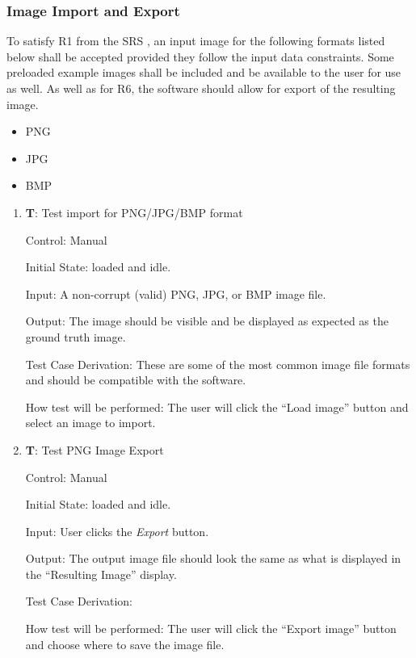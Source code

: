 \documentclass[12pt, titlepage]{article}
\newcounter{testnum} %
\begin{document}
\subsubsection{Image Import and Export} \label{subsec_img_io}

To satisfy R1 from the SRS \citep{SRS}, an input image for the following formats listed below shall be 
accepted provided they follow the input data constraints.
Some preloaded example images shall be included and be available to the user for use as well.
As well as for R6, the software should allow for export of the resulting image.

\begin{itemize}
  \item{PNG}
  \item{JPG}
  \item{BMP\\}
\end{itemize}

\begin{enumerate}

  \item{\textbf{T\thetestnum \label{T_inputImage}}: Test import for PNG/JPG/BMP format\\}
            
  Control: Manual
            
  Initial State: \progname{} loaded and idle.
            
  Input: A non-corrupt (valid) PNG, JPG, or BMP image file.
            
  Output: The image should be visible and be displayed as expected as the ground truth image.
            
  Test Case Derivation: These are some of the most common image file formats and should be compatible with the software.
            
  How test will be performed: The user will click the ``Load image'' button and select an image to import.

  \item{\textbf{T\thetestnum \label{T_exportImage}}: Test PNG Image Export\\}
              
  Control: Manual
            
  Initial State: \progname{} loaded and idle.
            
  Input: User clicks the \textit{Export} button.
            
  Output: The output image file should look the same as what is displayed in the ``Resulting Image'' display.

  Test Case Derivation: 

  How test will be performed: The user will click the ``Export image'' button and choose where to save the image file.

\end{enumerate}
\end{document}
